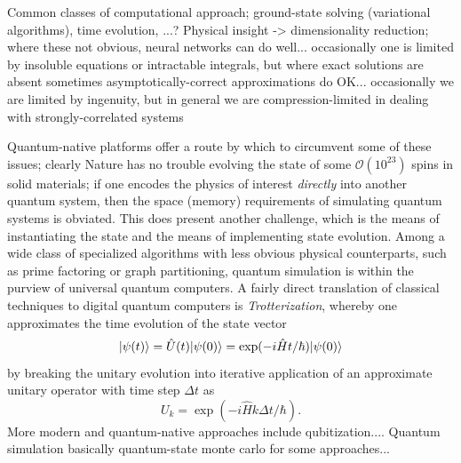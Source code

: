 	Common classes of computational approach; ground-state solving (variational algorithms), time evolution, ...?
	Physical insight -> dimensionality reduction; where these not obvious, neural networks can do well...
	occasionally one is limited by insoluble equations or intractable integrals, but where exact solutions are absent sometimes asymptotically-correct approximations do OK...
	occasionally we are limited by ingenuity, but in general we are compression-limited in dealing with strongly-correlated systems
	

	Quantum-native platforms offer a route by which to circumvent some of these issues; clearly Nature has no trouble evolving the state of some $\mathcal{O}(10^23)$ spins in solid materials; if one encodes the physics of interest \emph{directly} into another quantum system, then the space (memory) requirements of simulating quantum systems is obviated.
	This does present another challenge, which is the means of instantiating the state and the means of implementing state evolution.
	Among a wide class of specialized algorithms with less obvious physical counterparts, such as prime factoring or graph partitioning, quantum simulation is within the purview of universal quantum computers.
	A fairly direct translation of classical techniques to digital quantum computers is \emph{Trotterization}, whereby one approximates the time evolution of the state vector
	\begin{equation}
		|\psi(t)\rangle = \hat{U}(t)|\psi(0)\rangle = \exp(-i\hat{H}t/\hbar)|\psi(0)\rangle
	\end{equation}
	by breaking the unitary evolution into iterative application of an approximate unitary operator with time step $\Delta t$ as
	\begin{equation}
		U_{k} = \exp(-i\hat{H}k\Delta t/\hbar).
	\end{equation}
	More modern and quantum-native approaches include qubitization....
	Quantum simulation basically quantum-state monte carlo for some approaches...

